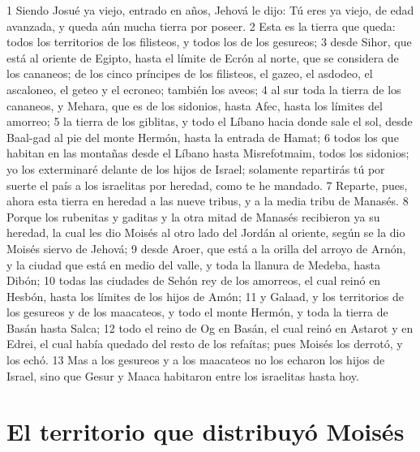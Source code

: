 1 Siendo Josué ya viejo, entrado en años, Jehová le dijo: Tú eres ya viejo, de edad avanzada, y queda aún mucha tierra por poseer.
2 Esta es la tierra que queda: todos los territorios de los filisteos, y todos los de los gesureos;
3 desde Sihor, que está al oriente de Egipto, hasta el límite de Ecrón al norte, que se considera de los cananeos; de los cinco príncipes de los filisteos, el gazeo, el asdodeo, el ascaloneo, el geteo y el ecroneo; también los aveos;
4 al sur toda la tierra de los cananeos, y Mehara, que es de los sidonios, hasta Afec, hasta los límites del amorreo;
5 la tierra de los giblitas, y todo el Líbano hacia donde sale el sol, desde Baal-gad al pie del monte Hermón, hasta la entrada de Hamat;
6 todos los que habitan en las montañas desde el Líbano hasta Misrefotmaim, todos los sidonios; yo los exterminaré delante de los hijos de Israel; solamente repartirás tú por suerte el país a los israelitas por heredad, como te he mandado.
7 Reparte, pues, ahora esta tierra en heredad a las nueve tribus, y a la media tribu de Manasés.
8 Porque los rubenitas y gaditas y la otra mitad de Manasés recibieron ya su heredad, la cual les dio Moisés al otro lado del Jordán al oriente, según se la dio Moisés siervo de Jehová;
9 desde Aroer, que está a la orilla del arroyo de Arnón, y la ciudad que está en medio del valle, y toda la llanura de Medeba, hasta Dibón;
10 todas las ciudades de Sehón rey de los amorreos, el cual reinó en Hesbón, hasta los límites de los hijos de Amón;
11 y Galaad, y los territorios de los gesureos y de los maacateos, y todo el monte Hermón, y toda la tierra de Basán hasta Salca;
12 todo el reino de Og en Basán, el cual reinó en Astarot y en Edrei, el cual había quedado del resto de los refaítas; pues Moisés los derrotó, y los echó.
13 Mas a los gesureos y a los maacateos no los echaron los hijos de Israel, sino que Gesur y Maaca habitaron entre los israelitas hasta hoy.
\section*{El territorio que distribuyó Moisés}


